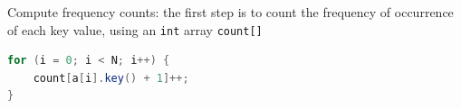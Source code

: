 \documentclass[8pt,a4paper,compress]{beamer}
\begin{document}
\begin{frame}[fragile]
\pause

Compute frequency counts: the first step is to count the frequency of occurrence of each key value, using an \lstinline{int} array \lstinline{count[]}

\begin{lstlisting}[language=Java]
for (i = 0; i < N; i++) {
    count[a[i].key() + 1]++;
}
\end{lstlisting}

\begin{center}
\end{center}
\end{frame}
\end{document}
